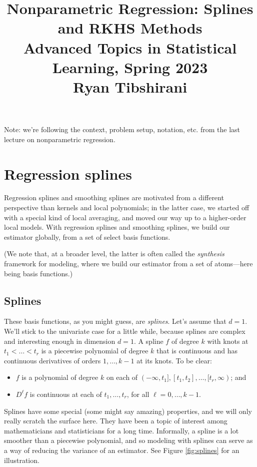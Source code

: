 \documentclass{article}
\title{Nonparametric Regression: Splines and RKHS Methods \\ \smallskip
\large Advanced Topics in Statistical Learning, Spring 2023 \\ \smallskip
Ryan Tibshirani}
\author{}
\date{}
\begin{document}
\maketitle
\RaggedRight
\vspace{-50pt}

Note: we're following the context, problem setup, notation, etc. from the last
lecture on nonparametric regression.

\section{Regression splines}

Regression splines and smoothing splines are motivated from a different
perspective than kernels and local polynomials; in the latter case, we started
off with a special kind of local averaging, and moved our way up to a
higher-order local models. With regression splines and smoothing splines, we
build our estimator globally, from a set of select basis functions. 

(We note that, at a broader level, the latter is often called the
\emph{synthesis} framework for modeling, where we build our estimator from a  
set of atoms---here being basis functions.) 

\subsection{Splines}

These basis functions, as you might guess, are \emph{splines}. Let's assume that
$d=1$. We'll stick to the univariate case for a little while, because splines
are complex and interesting enough in dimension $d=1$. A spline $f$ of degree
$k$ with knots at $t_1 < \dots < t_r$ is a piecewise polynomial of degree $k$  
that is continuous and has continuous derivatives of orders $1,\dots,k-1$ at its
knots. To be clear: 
\begin{itemize}
\item $f$ is a polynomial of degree $k$ on each of $(-\infty,t_1], [t_1,t_2],
  \dots, [t_r,\infty)$; and
\item $D^\ell f$ is continuous at each of $t_1,\dots,t_r$, for all
  $\ell=0,\dots,k-1$. 
\end{itemize}

Splines have some special (some might say amazing) properties, and we will only
really scratch the surface here. They have been a topic of interest among
mathematicians and statisticians for a long time. Informally, a spline is a lot
smoother than a piecewise polynomial, and so modeling with splines can serve as
a way of reducing the variance of an estimator. See Figure \ref{fig:splines} for
an illustration.  
\end{document}
